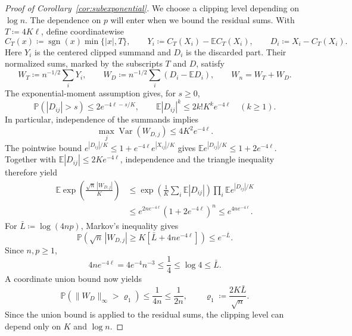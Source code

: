 \documentclass[11pt,letterpaper]{article}
\theoremstyle{remark}
\newcommand{\E}{\mathbb E}
\newcommand{\Pp}{\mathbb P}
\newcommand{\Var}{\operatorname{Var}}
\begin{document}
\begin{proof}[Proof of Corollary~\ref{cor:subexponential}]
We choose a clipping level depending on \(\log n\). The dependence
on \(p\) will enter when we bound the residual sums. With \(T\coloneqq4K\ell\), define coordinatewise
\[
 C_T(x)\coloneqq \operatorname{sgn}(x)\min\{|x|,T\},\qquad
 Y_i\coloneqq C_T(X_i)-\E C_T(X_i),\qquad D_i\coloneqq X_i-C_T(X_i).
\]
Here \(Y_i\) is the centered clipped summand and \(D_i\) is the discarded
part. Their normalized sums, marked by the subscripts \(T\) and \(D\), satisfy
\[
 W_T\coloneqq n^{-1/2}\sum_iY_i,\qquad
 W_D\coloneqq n^{-1/2}\sum_i(D_i-\E D_i),\qquad W_n=W_T+W_D.
\]
The exponential-moment assumption gives, for \(s\ge0\),
\[
 \Pp(|D_{ij}|>s)\le2e^{-4\ell-s/K},\qquad
 \E|D_{ij}|^k\le2k!K^ke^{-4\ell}\quad(k\ge1).
\]
In particular, independence of the summands implies
\begin{equation}
 \max_j\Var(W_{D,j})\le4K^2e^{-4\ell}.
 \label{tail:residual-moments}
\end{equation}
The pointwise bound \(e^{|D_{ij}|/K}\le1+e^{-4\ell}e^{|X_{ij}|/K}\)
gives \(\E e^{|D_{ij}|/K}\le1+2e^{-4\ell}\). Together with
\(\E|D_{ij}|\le2Ke^{-4\ell}\), independence and the triangle inequality
therefore yield
\begin{align*}
 \E\exp\!\left(\frac{\sqrt n\,|W_{D,j}|}{K}\right)
 &\le\exp\!\left(\frac1K\sum_i\E|D_{ij}|\right)
          \prod_i\E e^{|D_{ij}|/K}\\
 &\le e^{2ne^{-4\ell}}(1+2e^{-4\ell})^n
 \le e^{4ne^{-4\ell}}.
\end{align*}
For \(\bar L\coloneqq \log(4np)\), Markov's inequality gives
\[
 \Pp\!\left(\sqrt n\,|W_{D,j}|\ge K[\bar L+4ne^{-4\ell}]\right)\le e^{-\bar L}.
\]
Since \(n,p\ge1\),
\[
 4ne^{-4\ell}=4e^{-4}n^{-3}\le\frac14\le\log4\le \bar L.
\]
A coordinate union bound now yields
\begin{equation}
 \Pp(\|W_D\|_\infty>\varrho_1)\le\frac1{4n}\le\frac1{2n},\qquad
 \varrho_1\coloneqq \frac{2K\bar L}{\sqrt n}.
 \label{tail:sum-coupling}
\end{equation}
Since the union bound is applied to the residual sums, the clipping
level can depend only on \(K\) and \(\log n\).


\end{proof}
\end{document}
